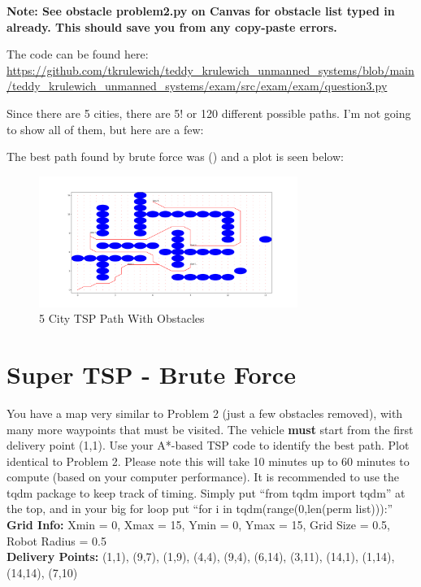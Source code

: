 \documentclass{article}
\begin{document}
\textbf{Note: See obstacle problem2.py on Canvas for obstacle list typed in already. This should
save you from any copy-paste errors.}

\bigskip
\noindent The code can be found here: \\
\url{https://github.com/tkrulewich/teddy_krulewich_unmanned_systems/blob/main/teddy_krulewich_unmanned_systems/exam/src/exam/exam/question3.py}

Since there are 5 cities, there are 5! or 120 different possible paths. I'm not going to show all of them, but here are a few:


\bigskip
The best path found by brute force was () and a plot is seen below:

\begin{figure}[H]
\centering
\includegraphics[width=0.75\textwidth]{images/question3.png}
\caption*{5 City TSP Path With Obstacles}
\end{figure}

\section{Super TSP - Brute Force}

You have a map very similar to Problem 2 (just a few obstacles removed),
with many more waypoints that must be visited. The vehicle \textbf{must} start from the first delivery point
(1,1). Use your A*-based TSP code to identify the best path. Plot identical to Problem 2. Please note
this will take 10 minutes up to 60 minutes to compute (based on your computer performance). It is
recommended to use the tqdm package to keep track of timing. Simply put “from tqdm import tqdm”
at the top, and in your big for loop put “for i in tqdm(range(0,len(perm list))):” \\

\bigskip
\noindent\textbf{Grid Info:} Xmin = 0, Xmax = 15, Ymin = 0, Ymax = 15, Grid Size = 0.5, Robot Radius = 0.5 \\
\textbf{Delivery Points:} (1,1), (9,7), (1,9), (4,4), (9,4), (6,14), (3,11), (14,1), (1,14), (14,14), (7,10)
\end{document}
